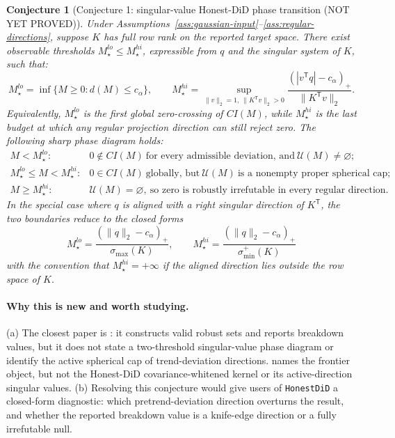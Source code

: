 \documentclass[11pt]{article}
\newcommand{\transpose}{\mathsf{T}}
\theoremstyle{definition}
\theoremstyle{plain}
\newtheorem{conjecture}{Conjecture}
\theoremstyle{remark}
\begin{document}
\begin{conjecture}[Conjecture 1: singular-value Honest-DiD phase transition (NOT YET PROVED)]\label{conj:svd-phase}
Under Assumptions~\ref{ass:gaussian-input}--\ref{ass:regular-directions}, suppose \(K\) has full row rank on the reported target space.
There exist observable thresholds \(M_\star^{lo}\le M_\star^{hi}\), expressible from \(q\) and the singular system of \(K\), such that:
\[
  M_\star^{lo}=
  \inf\{M\ge0:d(M)\le c_\alpha\},\qquad
  M_\star^{hi}=
  \sup_{\|v\|_2=1,\ \|K^\transpose v\|_2>0}
  \frac{(|v^\transpose q|-c_\alpha)_+}{\|K^\transpose v\|_2}.
\]
Equivalently, \(M_\star^{lo}\) is the first global zero-crossing of \(CI(M)\), while \(M_\star^{hi}\) is the last budget at which any regular projection direction can still reject zero.
The following sharp phase diagram holds:
\[
\begin{array}{ll}
M<M_\star^{lo}: & 0\notin CI(M)\ \text{for every admissible deviation, and}\ \mathcal U(M)\neq\varnothing;\\[2mm]
M_\star^{lo}\le M<M_\star^{hi}: & 0\in CI(M)\ \text{globally, but}\ \mathcal U(M)\ \text{is a nonempty proper spherical cap};\\[2mm]
M\ge M_\star^{hi}: & \mathcal U(M)=\varnothing,\ \text{so zero is robustly irrefutable in every regular direction.}
\end{array}
\]
In the special case where \(q\) is aligned with a right singular direction of \(K^\transpose\), the two boundaries reduce to the closed forms
\[
  M_\star^{lo}=\frac{(\|q\|_2-c_\alpha)_+}{\sigma_{\max}(K)},\qquad
  M_\star^{hi}=\frac{(\|q\|_2-c_\alpha)_+}{\sigma_{\min}^+(K)}
\]
with the convention that \(M_\star^{hi}=+\infty\) if the aligned direction lies outside the row space of \(K\).
\end{conjecture}
\paragraph{Why this is new and worth studying.}
(a) The closest paper is \citet{rambachan2023parallel}: it constructs valid robust sets and reports breakdown values, but it does not state a two-threshold singular-value phase diagram or identify the active spherical cap of trend-deviation directions.
\citet{masten2020breakdown} names the frontier object, but not the Honest-DiD covariance-whitened kernel or its active-direction singular values.
(b) Resolving this conjecture would give users of \texttt{HonestDiD} a closed-form diagnostic: which pretrend-deviation direction overturns the result, and whether the reported breakdown value is a knife-edge direction or a fully irrefutable null.
\end{document}
